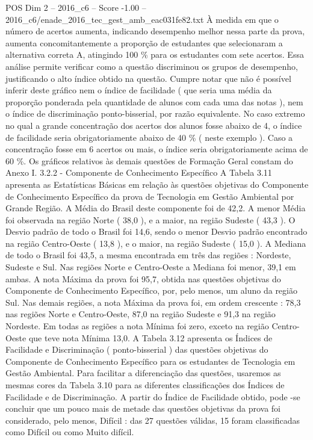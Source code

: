 \begin{textsample}{POS Dim 2 – 2016\_c6 – Score -1.00 – 2016\_c6/enade\_2016\_tec\_gest\_amb\_eac031fe82.txt}
À medida em que o número de acertos aumenta, indicando desempenho melhor nessa parte da prova, aumenta concomitantemente a proporção de estudantes que selecionaram a alternativa correta A, atingindo 100 \% para os estudantes com sete acertos.
Essa análise permite verificar como a questão discriminou os grupos de desempenho, justificando o alto índice obtido na questão.
Cumpre notar que não é possível inferir deste gráfico nem o índice de facilidade ( que seria uma média da proporção ponderada pela quantidade de alunos com cada uma das notas ), nem o índice de discriminação ponto-bisserial, por razão equivalente.
No caso extremo no qual a grande concentração dos acertos dos alunos fosse abaixo de 4, o índice de facilidade seria obrigatoriamente abaixo de 40 \% ( neste exemplo ).
Caso a concentração fosse em 6 acertos ou mais, o índice seria obrigatoriamente acima de 60 \%.
Os gráficos relativos às demais questões de Formação Geral constam do Anexo I. 3.2.2 - Componente de Conhecimento Específico A Tabela 3.11 apresenta as Estatísticas Básicas em relação às questões objetivas do Componente de Conhecimento Específico da prova de Tecnologia em Gestão Ambiental por Grande Região.
A Média do Brasil deste componente foi de 42,2.
A menor Média foi observada na região Norte ( 38,0 ), e a maior, na região Sudeste ( 43,3 ).
O Desvio padrão de todo o Brasil foi 14,6, sendo o menor Desvio padrão encontrado na região Centro-Oeste ( 13,8 ), e o maior, na região Sudeste ( 15,0 ).
A Mediana de todo o Brasil foi 43,5, a mesma encontrada em três das regiões : Nordeste, Sudeste e Sul.
Nas regiões Norte e Centro-Oeste a Mediana foi menor, 39,1 em ambas.
A nota Máxima da prova foi 95,7, obtida nas questões objetivas do Componente de Conhecimento Específico, por, pelo menos, um aluno da região Sul.
Nas demais regiões, a nota Máxima da prova foi, em ordem crescente : 78,3 nas regiões Norte e Centro-Oeste, 87,0 na região Sudeste e 91,3 na região Nordeste.
Em todas as regiões a nota Mínima foi zero, exceto na região Centro-Oeste que teve nota Mínima 13,0.
A Tabela 3.12 apresenta os Índices de Facilidade e Discriminação ( ponto-bisserial ) das questões objetivas do Componente de Conhecimento Específico para os estudantes de Tecnologia em Gestão Ambiental.
Para facilitar a diferenciação das questões, usaremos as mesmas cores da Tabela 3.10 para as diferentes classificações dos Índices de Facilidade e de Discriminação.
A partir do Índice de Facilidade obtido, pode -se concluir que um pouco mais de metade das questões objetivas da prova foi considerado, pelo menos, Difícil : das 27 questões válidas, 15 foram classificadas como Difícil ou como Muito difícil.

\end{textsample}
